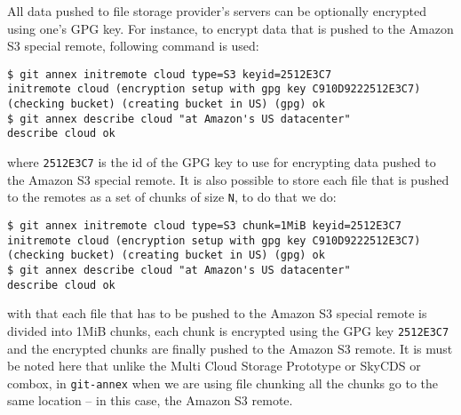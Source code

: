 All data pushed to file storage provider's servers can be optionally
encrypted using one's GPG key. For instance, to encrypt data that is
pushed to the Amazon S3 special remote, following command is
used\cite{docs:git-annex-as3}:

\begin{verbatim}
$ git annex initremote cloud type=S3 keyid=2512E3C7
initremote cloud (encryption setup with gpg key C910D9222512E3C7) (checking bucket) (creating bucket in US) (gpg) ok
$ git annex describe cloud "at Amazon's US datacenter"
describe cloud ok
\end{verbatim}

where \verb+2512E3C7+ is the id of the GPG key to use for encrypting
data pushed to the Amazon S3 special remote. It is also possible to
store each file that is pushed to the remotes as a set of chunks of
size \verb+N+, to do that we do:

\begin{verbatim}
$ git annex initremote cloud type=S3 chunk=1MiB keyid=2512E3C7
initremote cloud (encryption setup with gpg key C910D9222512E3C7) (checking bucket) (creating bucket in US) (gpg) ok
$ git annex describe cloud "at Amazon's US datacenter"
describe cloud ok
\end{verbatim}

with that each file that has to be pushed to the Amazon S3 special
remote is divided into 1MiB chunks, each chunk is encrypted using the
GPG key \verb+2512E3C7+ and the encrypted chunks are finally pushed to
the Amazon S3 remote. It is must be noted here that unlike the Multi
Cloud Storage Prototype or SkyCDS or combox, in \verb+git-annex+ when
we are using file chunking all the chunks go to the same location --
in this case, the Amazon S3 remote.
